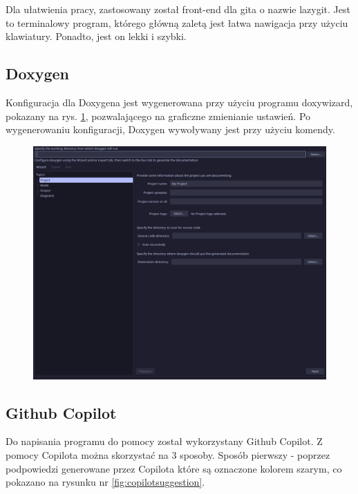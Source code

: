 Dla ułatwienia pracy, zastosowany został front-end dla gita o nazwie lazygit. Jest to terminalowy program, którego główną zaletą jest łatwa nawigacja przy użyciu klawiatury. Ponadto, jest on lekki i szybki.

\subsection{Doxygen}

Konfiguracja dla Doxygena jest wygenerowana przy użyciu programu doxywizard, pokazany na rys. \ref{fig:doxywizard}, pozwalającego na graficzne zmienianie ustawień. Po wygenerowaniu konfiguracji, Doxygen wywoływany jest przy użyciu komendy.

\begin{figure}[H]
	\centering
	\includegraphics[width=1\textwidth]{images/doxywizard.png}
	\caption{}
	\label{fig:doxywizard}
\end{figure}

\subsection{Github Copilot}
Do napisania programu do pomocy został wykorzystany Github Copilot. Z pomocy Copilota można skorzystać na 3 sposoby. Sposób pierwszy - poprzez podpowiedzi generowane przez Copilota które są oznaczone kolorem szarym, co pokazano na rysunku nr \ref{fig:copilotsuggestion}.

